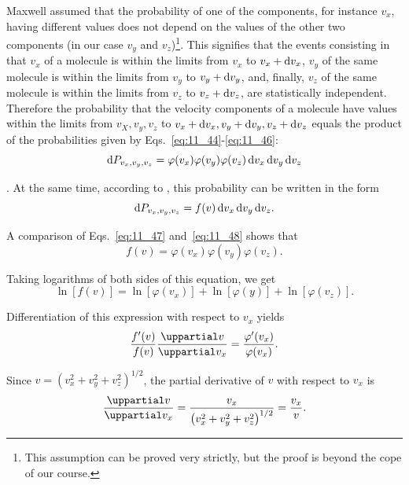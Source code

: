Maxwell assumed that the probability of one of the components, for instance $v_x$, having different values does not depend on the values of the other two components (in our case $v_y$ and $v_z$)\footnote{This assumption can be proved very strictly, but the proof is beyond the cope of our course.}. This signifies that the events consisting in that $v_x$ of a molecule is within the limits from $v_x$ to $v_x+\mathrm{d} v_x$, $v_y$ of the same molecule is within the limits from $v_y$ to $v_y+\mathrm{d} v_y$, and, finally, $v_z$ of the same molecule is within the limits from $v_z$ to $v_z+\mathrm{d} v_z$, are statistically independent. Therefore the probability that the velocity components of a molecule have values within the limits from $v_X, v_y, v_z$ to $v_x+\mathrm{d} v_x, v_y+\mathrm{d} v_y, v_z+\mathrm{d} v_z$ equals the product of the probabilities given by Eqs.~\eqref{eq:11_44}-\eqref{eq:11_46}:
\begin{equation}\label{eq:11_47}
	\mathrm{d} P_{v_x, v_y, v_z} = \varphi(v_x)\varphi(v_y)\varphi(v_z)\,\mathrm{d} v_x\,\mathrm{d} v_y\,\mathrm{d} v_z
\end{equation}

. At the same time, according to , this probability can be written in the form
\begin{equation}\label{eq:11_48}
	\mathrm{d} P_{v_x, v_y, v_z} = f(v)\,\mathrm{d} v_x\,\mathrm{d} v_y\,\mathrm{d} v_z.
\end{equation}

A comparison of Eqs.~\eqref{eq:11_47} and~\eqref{eq:11_48} shows that
\begin{equation}\label{eq:11_49}
	f(v) = \varphi(v_x)\varphi(v_y)\varphi(v_z).
\end{equation}

\noindent
Taking logarithms of both sides of this equation, we get
\begin{equation*}
	\ln[f(v)] = \ln[\varphi(v_x)] + \ln[\varphi(y)] + \ln[\varphi(v_z)].
\end{equation*}

\noindent
Differentiation of this expression with respect to $v_x$ yields
\begin{equation}\label{eq:11_50}
	\frac{f'(v)}{f(v)}\diffpartial{v}{v_x} = \frac{\varphi'(v_x)}{\varphi(v_x)}.
\end{equation}

Since $v=\left(v_x^2+v_y^2+v_z^2\right)^{1/2}$, the partial derivative of $v$ with respect to $v_x$ is
\begin{equation*}
	\diffpartial{v}{v_x} = \frac{v_x}{\left(v_x^2+v_y^2+v_z^2\right)^{1/2}} = \frac{v_x}{v}.
\end{equation*}

